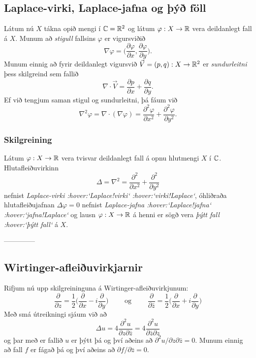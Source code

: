 \subsection*{Laplace-virki, Laplace-jafna og þýð föll }

Látum nú $X$ tákna opið mengi í ${\mathbb C}={\mathbb R}^2$ og látum $\varphi:X\to {\mathbb R}$
vera deildanlegt fall á $X$. Munum að {\it stigull} fallsins
$\varphi$  er vigursviðið 
$$
\nabla \varphi=\big(\dfrac{\partial \varphi}{\partial x},
\dfrac{\partial \varphi}{\partial y}\big).
$$
Munum einnig að fyrir deildanlegt vigursvið  $\vec V=(p,q):X\to {\mathbb R}^ 2$ er 
{\it sundurleitni} þess skilgreind sem fallið
$$
\nabla\cdot \vec V=\dfrac{\partial p}{\partial x}+\dfrac{\partial
q}{\partial y}.
$$
Ef við tengjum saman stigul og sundurleitni, þá fáum við  
$$
\nabla^2\varphi=\nabla\cdot (\nabla \varphi)= \dfrac {\partial^2 \varphi}{\partial x^2}+  
\dfrac {\partial^2 \varphi}{\partial y^2}.  
$$

\subsubsection{Skilgreining} Látum  $\varphi:X\to {\mathbb R}$ vera tvisvar deildanlegt fall 
á opnu hlutmengi $X$ í ${\mathbb C}$.  Hlutafleiðuvirkinn
$$
{\Delta}=\nabla^2=\dfrac {\partial^2 }{\partial x^2}+  
\dfrac {\partial^2 }{\partial y^2}
$$
nefnist {\it Laplace-virki :hover:`Laplace!virki` :hover:`virki!Laplace`},
óhliðraða hlutafleiðujafnan
${\Delta}\varphi=0$ nefnist {\it
Laplace-jafna :hover:`Laplace!jafna` :hover:`jafna!Laplace`}
og lausn $\varphi:X\to {\mathbb R}$  á  henni er sögð vera {\it þýtt fall :hover:`þýtt
fall`} á $X$.


--------------



\subsection*{Wirtinger-afleiðuvirkjarnir}

Rifjum nú upp skilgreininguna á Wirtinger-afleiðuvirkjunum:
$$
\dfrac{\partial}{\partial z}=\dfrac 12\bigg(\dfrac{\partial }{\partial x}-i
\dfrac{\partial}{\partial y}\bigg)
\qquad \text{ og } \qquad 
\dfrac{\partial}{\partial \bar z}=\dfrac 12\bigg(\dfrac{\partial
}{\partial x}+i \dfrac{\partial}{\partial y}\bigg)
$$
Með smá útreikningi sjáum við að
$$
\Delta u=4\dfrac{\partial^2 u}{\partial z\partial \bar z}
=4\dfrac{\partial^2 u}{\partial \bar z\partial z}
$$
og þar með er fallið $u$ er þýtt þá og því aðeins að
$\partial^2 u/\partial z\partial\bar z =0$.  Munum einnig að fall $f$
er fágað þá og því aðeins að $\partial f/\partial \bar z=0$.


